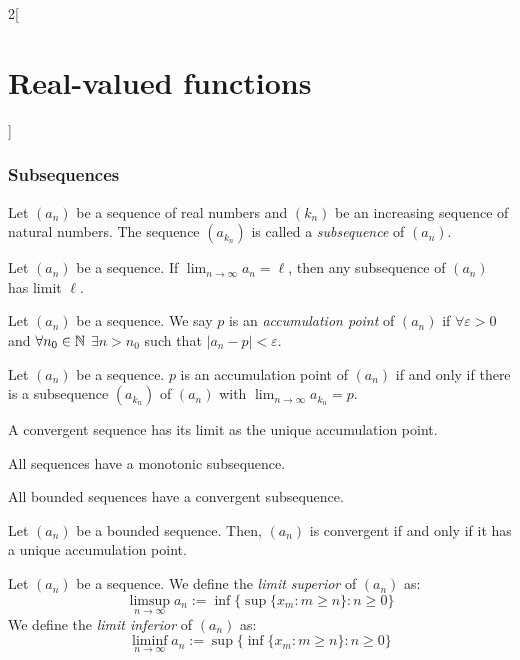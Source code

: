 \documentclass[../../../main.tex]{subfiles}
\begin{document}
\begin{multicols}{2}[\section{Real-valued functions}]
  \subsubsection{Subsequences}
  \begin{definition}[Subsequence]
    Let $(a_n)$ be a sequence of real numbers and $(k_n)$ be an increasing sequence of natural numbers. The sequence $(a_{k_n})$ is called a \emph{subsequence} of $(a_n)$.
  \end{definition}
  \begin{lemma}
    Let $(a_n)$ be a sequence. If $\displaystyle\lim_{n\to\infty} a_n=\ell$, then any subsequence of $(a_n)$ has limit $\ell$.
  \end{lemma}
  \begin{definition}
    Let $(a_n)$ be a sequence. We say $p$ is an \emph{accumulation point} of $(a_n)$ if $\forall\varepsilon>0$ and $\forall n_0\in\mathbb{N}$ $\exists n>n_0$ such that $|a_n-p|<\varepsilon$.
  \end{definition}
  \begin{proposition}
    Let $(a_n)$ be a sequence. $p$ is an accumulation point of $(a_n)$ if and only if there is a subsequence $(a_{k_n})$ of $(a_n)$ with $\displaystyle\lim_{n\to\infty}a_{k_n}=p$.
  \end{proposition}
  \begin{corollary}
    A convergent sequence has its limit as the unique accumulation point.
  \end{corollary}
  \begin{proposition}
    All sequences have a monotonic subsequence.
  \end{proposition}
  \begin{theorem}
    All bounded sequences have a convergent subsequence.
  \end{theorem}
  \begin{proposition}
    Let $(a_n)$ be a bounded sequence. Then, $(a_n)$ is convergent if and only if it has a unique accumulation point.
  \end{proposition}
  \begin{definition}
    Let $(a_n)$ be a sequence. We define the \emph{limit superior} of $(a_n)$ as:
    $$\limsup_{n\to\infty}a_n:=\inf\{\sup\{x_m:m\geq n\}:n\geq 0\}$$
    We define the \emph{limit inferior} of $(a_n)$ as:
    $$\liminf_{n\to\infty}a_n:=\sup\{\inf\{x_m:m\geq n\}:n\geq 0\}$$
  \end{definition}
  \begin{proposition}

\end{proposition}
\end{multicols}
\end{document}
